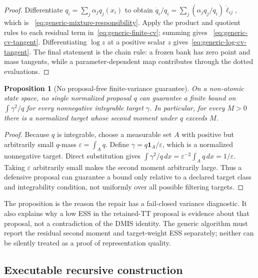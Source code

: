 \documentclass[11pt]{article}
\newtheorem{proposition}{Proposition}
\begin{document}
\begin{proof}
Differentiate $q_i=\sum_j\alpha_jq_j(x_i)$ to obtain
$\dot q_i/q_i=\sum_j(\alpha_jq_j/q_i)\dot\ell_{ij}$, which is
~\eqref{eq:generic-mixture-responsibility}. Apply the product and quotient
rules to each residual term in~\eqref{eq:generic-finite-cv}; summing gives
~\eqref{eq:generic-cv-tangent}. Differentiating $\log z$ at a positive
scalar $z$ gives~\eqref{eq:generic-log-cv-tangent}. The final statement is
the chain rule: a frozen bank has zero point and mass tangents, while a
parameter-dependent map contributes through the dotted evaluations.
\end{proof}

\begin{proposition}[No proposal-free finite-variance guarantee]
\label{prop:generic-no-free-lunch}
On a non-atomic state space, no single normalized proposal $q$ can guarantee a
finite bound on $\int\gamma^2/q$ for every nonnegative integrable target
$\gamma$. In particular, for every $M>0$ there is a normalized target whose
second moment under $q$ exceeds $M$.
\end{proposition}

\begin{proof}
Because $q$ is integrable, choose a measurable set $A$ with positive but
arbitrarily small $q$-mass $\varepsilon=\int_Aq$. Define
$\gamma=q\mathbf 1_A/\varepsilon$, which is a normalized
nonnegative target. Direct substitution gives
$\int\gamma^2/q\,dx=\varepsilon^{-2}\int_Aq\,dx=1/\varepsilon$.
Taking $\varepsilon$ arbitrarily small makes the second moment arbitrarily
large. Thus a defensive proposal can guarantee a bound only relative to a
declared target class and integrability condition, not uniformly over all
possible filtering targets.
\end{proof}

The proposition is the reason the repair has a fail-closed variance diagnostic.
It also explains why a low ESS in the retained-TT proposal is evidence about
that proposal, not a contradiction of the DMIS identity. The generic algorithm
must report the residual second moment and target-weight ESS separately; neither
can be silently treated as a proof of representation quality.

\subsection{Executable recursive construction}
\label{sec:generic-recursive-construction}
\end{document}
